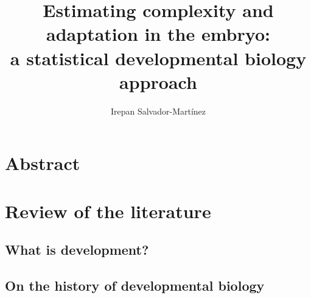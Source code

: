 \documentclass[officiallayout]{tktla_modified}
\title{Estimating complexity and adaptation 
in the embryo:
\\ a statistical developmental biology approach
}
\author{Irepan Salvador-Mart\'inez}
\begin{document}
\frontmatter

\maketitle
\makenomenclature

\begin{acknowledgements}
  
\end{acknowledgements}


\tableofcontents

\mainmatter





\printnomenclature


\chapter{Abstract}
	


\chapter{Review of the literature}


\section{What is development?}
	
\section{On the history of developmental biology}
	
	
\end{document}
